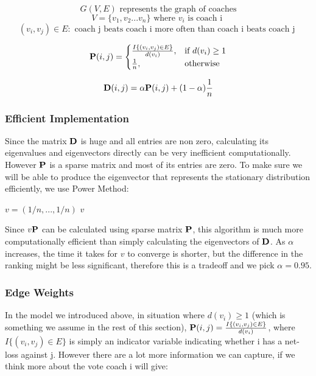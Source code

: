 \documentclass[titlepage]{article}
\begin{document}
$$G(V, E) \mbox{ represents the graph of coaches}$$
$$V = \{v_1, v_2 ... v_n\} \mbox{ where } v_i \mbox{ is coach i }$$
$$(v_i, v_j) \in E : \mbox{ coach j beats coach i more often than coach i beats coach j }$$



\[
    {\bf P} (i, j)= 
\begin{cases}
    \frac{ I\{(v_i, v_j) \in E\}}{d(v_i)},& \text{if } d(v_i) \geq 1\\
    \frac{1}{n},              & \text{otherwise}
\end{cases}
\]

$${\bf D} (i, j) = \alpha {\bf P} (i, j)  + (1-\alpha)\frac{1}{n}$$


\subsubsection*{Efficient Implementation}


Since the matrix ${\bf D}$ is huge and all entries are non zero, calculating its eigenvalues and eigenvectors directly can be very inefficient computationally. However ${\bf P}$ is a sparse matrix and most of its entries are zero. To make sure we will be able to produce the eigenvector that represents the stationary distribution efficiently, we use Power Method:

\vspace{5mm}

\begin{algorithm}[H]

$v = (1/n, ... ,1/n)$\;
\Return $v$\;
\end{algorithm}

\vspace{5mm}

\noindent Since $v {\bf P}$ can be calculated using sparse matrix ${\bf P}$, this algorithm is much more computationally efficient than simply calculating the eigenvectors of ${\bf D}$. As $\alpha$ increases, the time it takes for $v$ to converge is shorter, but the difference in the ranking might be less significant, therefore this is a tradeoff and we pick $\alpha = 0.95$.

\subsubsection*{Edge Weights}

\noindent In the model we introduced above, in situation where $d(v_i) \geq 1$ (which is something we assume in the rest of this section), ${\bf P}(i, j) = \frac{ I\{(v_i, v_j) \in E\}}{d(v_i)}$, where $I\{(v_i, v_j) \in E\}$ is simply an indicator variable indicating whether i has a net-loss against j. However there are a lot more information we can capture, if we think more about the vote coach i will give:
\end{document}
